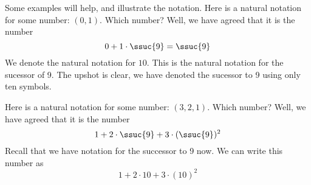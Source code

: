 Some examples will help, and illustrate the notation.
Here is a natural notation for some number: $(0, 1)$.
Which number?
Well, we have agreed that it is the number
\[
0 + 1\cdot \ssuc{9} = \ssuc{9}
\]
We denote the natural notation for $10$.
This is the natural notation for the sucessor of 9.
The upshot is clear, we have denoted the sucessor to 9 using only ten symbols.

Here is a natural notation for some number: $(3, 2, 1)$.
Which number?
Well, we have agreed that it is the number
\[
1 + 2\cdot \ssuc{9} + 3\cdot (\ssuc{9})^2
\]
Recall that we have notation for the successor to 9 now.
We can write this number as
\[
1 + 2\cdot 10 + 3\cdot (10)^2
\]

\blankpage